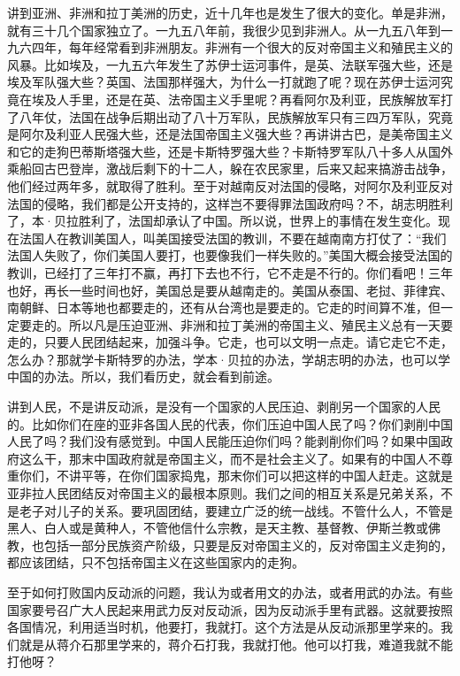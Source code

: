 讲到亚洲、非洲和拉丁美洲的历史，近十几年也是发生了很大的变化。单是非洲，就有三十几个国家独立了。一九五八年前，我很少见到非洲人。从一九五八年到一九六四年，每年经常看到非洲朋友。非洲有一个很大的反对帝国主义和殖民主义的风暴。比如埃及，一九五六年发生了苏伊士运河事件，是英、法联军强大些，还是埃及军队强大些？英国、法国那样强大，为什么一打就跑了呢？现在苏伊士运河究竟在埃及人手里，还是在英、法帝国主义手里呢？再看阿尔及利亚，民族解放军打了八年仗，法国在战争后期出动了八十万军队，民族解放军只有三四万军队，究竟是阿尔及利亚人民强大些，还是法国帝国主义强大些？再讲讲古巴，是美帝国主义和它的走狗巴蒂斯塔强大些，还是卡斯特罗强大些？卡斯特罗军队八十多人从国外乘船回古巴登岸，激战后剩下的十二人，躲在农民家里，后来又起来搞游击战争，他们经过两年多，就取得了胜利。至于对越南反对法国的侵略，对阿尔及利亚反对法国的侵略，我们都是公开支持的，这样岂不要得罪法国政府吗？不，胡志明胜利了，本·贝拉胜利了，法国却承认了中国。所以说，世界上的事情在发生变化。现在法国人在教训美国人，叫美国接受法国的教训，不要在越南南方打仗了：“我们法国人失败了，你们美国人要打，也要像我们一样失败的。”美国大概会接受法国的教训，已经打了三年打不赢，再打下去也不行，它不走是不行的。你们看吧！三年也好，再长一些时间也好，美国总是要从越南走的。美国从泰国、老挝、菲律宾、南朝鲜、日本等地也都要走的，还有从台湾也是要走的。它走的时间算不准，但一定要走的。所以凡是压迫亚洲、非洲和拉丁美洲的帝国主义、殖民主义总有一天要走的，只要人民团结起来，加强斗争。它走，也可以文明一点走。请它走它不走，怎么办？那就学卡斯特罗的办法，学本·贝拉的办法，学胡志明的办法，也可以学中国的办法。所以，我们看历史，就会看到前途。

讲到人民，不是讲反动派，是没有一个国家的人民压迫、剥削另一个国家的人民的。比如你们在座的亚非各国人民的代表，你们压迫中国人民了吗？你们剥削中国人民了吗？我们没有感觉到。中国人民能压迫你们吗？能剥削你们吗？如果中国政府这么干，那末中国政府就是帝国主义，而不是社会主义了。如果有的中国人不尊重你们，不讲平等，在你们国家捣鬼，那末你们可以把这样的中国人赶走。这就是亚非拉人民团结反对帝国主义的最根本原则。我们之间的相互关系是兄弟关系，不是老子对儿子的关系。要巩固团结，要建立广泛的统一战线。不管什么人，不管是黑人、白人或是黄种人，不管他信什么宗教，是天主教、基督教、伊斯兰教或佛教，也包括一部分民族资产阶级，只要是反对帝国主义的，反对帝国主义走狗的，都应该团结，只不包括帝国主义在这些国家内的走狗。

至于如何打败国内反动派的问题，我认为或者用文的办法，或者用武的办法。有些国家要号召广大人民起来用武力反对反动派，因为反动派手里有武器。这就要按照各国情况，利用适当时机，他要打，我就打。这个方法是从反动派那里学来的。我们就是从蒋介石那里学来的，蒋介石打我，我就打他。他可以打我，难道我就不能打他呀？

